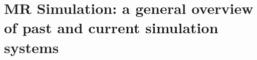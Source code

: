 \section{MR Simulation: a general overview of past and current simulation systems}
\label{chapterlabel2sec1}





